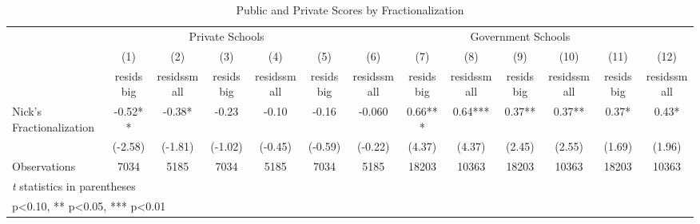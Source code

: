 \begin{sidewaystable}[htbp]\centering
\def\sym#1{\ifmmode^{#1}\else\(^{#1}\)\fi}
\caption{Public and Private Scores by Fractionalization}
\begin{tabular}{l*{12}{c}}
\toprule
                &\multicolumn{5}{c}{Private Schools}                             &\multicolumn{7}{c}{Government Schools}                                                    \\\cmidrule(lr){2-6}\cmidrule(lr){7-13}
                &\multicolumn{1}{c}{(1)}&\multicolumn{1}{c}{(2)}&\multicolumn{1}{c}{(3)}&\multicolumn{1}{c}{(4)}&\multicolumn{1}{c}{(5)}&\multicolumn{1}{c}{(6)}&\multicolumn{1}{c}{(7)}&\multicolumn{1}{c}{(8)}&\multicolumn{1}{c}{(9)}&\multicolumn{1}{c}{(10)}&\multicolumn{1}{c}{(11)}&\multicolumn{1}{c}{(12)}\\
                &\multicolumn{1}{c}{residsbig}&\multicolumn{1}{c}{residssmall}&\multicolumn{1}{c}{residsbig}&\multicolumn{1}{c}{residssmall}&\multicolumn{1}{c}{residsbig}&\multicolumn{1}{c}{residssmall}&\multicolumn{1}{c}{residsbig}&\multicolumn{1}{c}{residssmall}&\multicolumn{1}{c}{residsbig}&\multicolumn{1}{c}{residssmall}&\multicolumn{1}{c}{residsbig}&\multicolumn{1}{c}{residssmall}\\
\midrule
Nick's Fractionalization&    -0.52** &    -0.38*  &    -0.23   &    -0.10   &    -0.16   &   -0.060   &     0.66***&     0.64***&     0.37** &     0.37** &     0.37*  &     0.43*  \\
                &  (-2.58)   &  (-1.81)   &  (-1.02)   &  (-0.45)   &  (-0.59)   &  (-0.22)   &   (4.37)   &   (4.37)   &   (2.45)   &   (2.55)   &   (1.69)   &   (1.96)   \\
\midrule
Observations    &     7034   &     5185   &     7034   &     5185   &     7034   &     5185   &    18203   &    10363   &    18203   &    10363   &    18203   &    10363   \\
\bottomrule
\multicolumn{13}{l}{\footnotesize \textit{t} statistics in parentheses}\\
\multicolumn{13}{l}{\footnotesize * p<0.10, ** p<0.05, *** p<0.01}\\
\end{tabular}
\end{sidewaystable}

